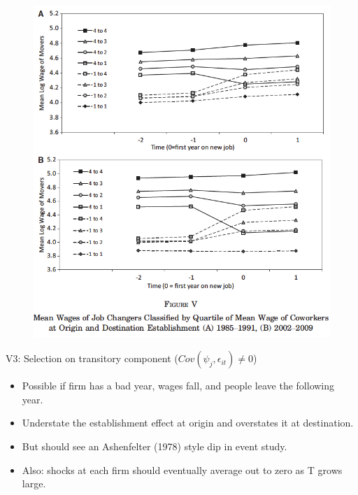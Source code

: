 \documentclass[notes=show]{beamer}
\begin{document}
\begin{frame}
\begin{figure}[p!]
	\begin{adjustbox}
 \includegraphics[width=.75\textwidth]{figures/Fig5} 
 	\end{adjustbox}
\end{figure}
\end{frame}

\begin{frame}{V3: Selection on transitory component ($Cov(\psi_{j},\epsilon_{it}) \neq 0$)}
	\begin{itemize}
	\item Possible if firm has a bad year, wages fall, and people leave the following year. \medskip
        \item Understate the establishment effect at origin and overstates it at destination. \medskip
        \item But should see an Ashenfelter (1978) style dip in event study. \medskip
        \item Also: shocks at each firm should eventually average out to zero as T grows large.
	\end{itemize}
\end{frame}
\end{document}
